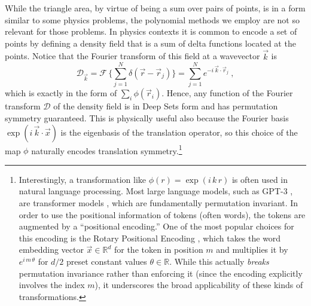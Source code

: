 \documentclass[10pt]{article}
\newcommand{\secbreak}{\bigskip{\centering\footnotesize%
\rotatebox[origin=c]{55}{$\triangle$}~~~%
\rotatebox[origin=c]{35}{$\triangle$}~~~%
\rotatebox[origin=c]{15}{$\triangle$}\par}\bigskip\noindent}
\begin{document}
\secbreak
While the triangle area, by virtue of being a sum over pairs of points, is in a form similar to some physics problems, the polynomial methods we employ are not so relevant for those problems.
In physics contexts it is common to encode a set of points by defining a density field that is a sum of delta functions located at the points.
Notice that the Fourier transform of this field at a wavevector $\vec{k}$ is
\begin{equation}
    \mathcal{D}_{\vec{k}} = \mathcal{F} \,\bigg\{
        \sum_{j=1}^{N} \delta(\vec{r} - \vec{r}_j)
    \bigg\}
    = \sum_{j=1}^{N} e^{-i \, \vec{k} \cdot \vec{r}_j}~,
\end{equation}
which is exactly in the form of $\sum_i \phi(\vec{r}_i)$.
Hence, any function of the Fourier transform $\mathcal{D}$ of the density field is in Deep Sets form and has permutation symmetry guaranteed.
This is physically useful also because the Fourier basis $\exp (i\, \vec{k}\cdot\vec{x})$ is the eigenbasis of the translation operator, so this choice of the map $\phi$ naturally encodes translation symmetry.\footnote{%
    Interestingly, a transformation like $\phi(r) = \exp(i\,k\,r)$ is often used in natural language processing.
    Most large language models, such as GPT-3 \citep{Brown2020GPT3}, are transformer models \citep{Vaswani2017Attention}, which are fundamentally permutation invariant.
    In order to use the positional information of tokens (often words), the tokens are augmented by a ``positional encoding.''
    One of the most popular choices for this encoding is the Rotary Positional Encoding \citep[RoPE;][]{Su2024Roformer}, which takes the word embedding vector $\vec{x} \in \mathbb{R}^{d}$ for the token in position $m$ and multiplies it by $e^{i \, m \, \theta}$ for $d/2$ preset constant values $\theta \in \mathbb{R}$.
    While this actually \emph{breaks} permutation invariance rather than enforcing it (since the encoding explicitly involves the index $m$), it underscores the broad applicability of these kinds of transformations.}
\end{document}

